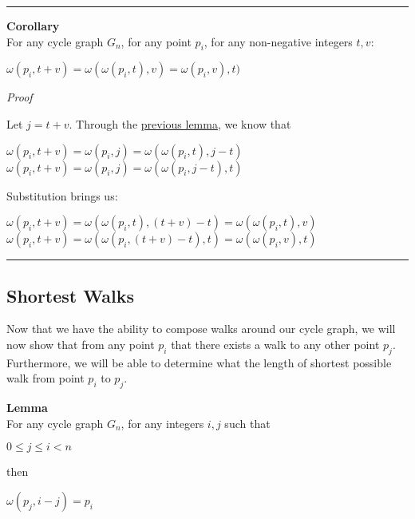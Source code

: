 \documentclass[a4paper,12pt]{article}
\begin{document}
\begin{center}
\noindent\rule{8cm}{0.4pt}
\end{center}


\label{corollary:composition_of_walks}
\hypertarget{corollary:composition_of_walks}{}
\begin{tcolorbox}
\textbf{Corollary}\\
For any cycle graph $G_n$, for any point $p_i$, for any non-negative integers $t, v$:
\begin{center}
$\omega(p_i, t + v) = \omega(\omega(p_i, t), v) = \omega(p_i, v), t)$
\end{center}
\end{tcolorbox}

\noindent
\textit{Proof}

\noindent Let $j = t + v$. Through the \hyperlink{lemma:composition_of_sub_walks}
{previous lemma}, we know that
\begin{center}
$\omega(p_i, t + v) = \omega(p_i, j) = \omega(\omega(p_i, t), j - t)$\\
$\omega(p_i, t + v) = \omega(p_i, j) = \omega(\omega(p_i, j - t), t)$
\end{center}

\noindent Substitution brings us:
\begin{center}
$\omega(p_i, t + v) = \omega(\omega(p_i, t), (t + v) - t) = \omega(\omega(p_i, t), v)$
$\omega(p_i, t + v) = \omega(\omega(p_i, (t + v) - t), t) = \omega(\omega(p_i, v), t)$
\end{center}


\begin{center}
\noindent\rule{8cm}{0.4pt}
\end{center}



\subsection{Shortest Walks}
\label{sec:shortest_walks}

Now that we have the ability to compose walks around our cycle graph, we will now show that from any point $p_i$ that there exists a walk to any other point $p_j$. Furthermore, we will be able to determine what the length of shortest possible walk from point $p_i$ to $p_j$.\\


\label{lemma:existence_of_walk_1}
\hypertarget{lemma:existence_of_walk_1}{}
\begin{tcolorbox}
\textbf{Lemma}\\
For any cycle graph $G_n$, for any integers $i, j$ such that
\begin{center}
$0 \leq j \leq i < n$
\end{center}

\noindent then
\begin{center}
$\omega(p_j, i - j) = p_i$
\end{center}
\end{tcolorbox}
\end{document}
